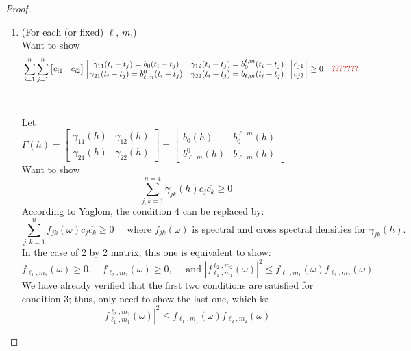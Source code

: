 \documentclass[11pt]{article}
\begin{document}
\begin{itemize}
\begin{proof}
\begin{enumerate}
\item
{\color{red}(For each (or fixed) $\ell$, $m$,)}\\
Want to show\\
\begin{align*}
&\sum_{i=1}^n \sum_{j=1}^n 
\begin{bmatrix}
c_{i1} & c_{i2}
\end{bmatrix}
\begin{bmatrix}
\gamma_{11}(t_i-t_j) = b_0(t_i-t_j) & \gamma_{12}(t_i-t_j) = b_0^{\ell,m}(t_i-t_j)\\ 
\gamma_{21}(t_i-t_j) = b_{\ell,m}^0(t_i-t_j) & \gamma_{22}(t_i-t_j) = b_{\ell,m}(t_i-t_j)
\end{bmatrix}
\begin{bmatrix}
c_{j1}\\
c_{j2} 
\end{bmatrix}
\ge0 \quad{\color{red}???????}
\end{align*}
\\
\\
Let\\
$\Gamma(h)= 
\begin{bmatrix}
\gamma_{11}(h) & \gamma_{12}(h) \\ 
\gamma_{21}(h) & \gamma_{22}(h) 
\end{bmatrix}
=
\begin{bmatrix}
b_{0}(h) & b_{0}^{\ell,m}(h) \\ 
b_{\ell,m}^{0}(h) & b_{\ell,m}(h) 
\end{bmatrix}$
\\

Want to show\\
$$\sum_{j,k=1}^{n=4} \gamma_{jk}(h) c_j \overline{c_k} \ge 0$$
According to Yaglom, the condition 4 can be replaced by:\\
$$\sum_{j,k=1}^n f_{jk}(\omega) c_j \overline{c_k} \ge 0 \quad \text{ where } f_{jk}(\omega) \text{ is spectral and cross spectral densities for } \gamma_{jk}(h).$$
In the case of 2 by 2 matrix, this one is equivalent to show:\\
$$f_{\ell_1,m_1}(\omega) \ge 0, \quad f_{\ell_2,m_2}(\omega) \ge 0, \quad \text{ and } |f_{\ell_1,m_1}^{\ell_2, m_2}(\omega)|^2 \le f_{\ell_1,m_1}(\omega) f_{\ell_2,m_2}(\omega)$$
We have already verified that the first two conditions are satisfied for condition 3; thus, only need to show the last one, which is:\\
$$|f_{\ell_1,m_1}^{\ell_2, m_2}(\omega)|^2 \le f_{\ell_1,m_1}(\omega) f_{\ell_2,m_2}(\omega)$$


\end{enumerate}
\end{proof}
\end{itemize}
\end{document}

